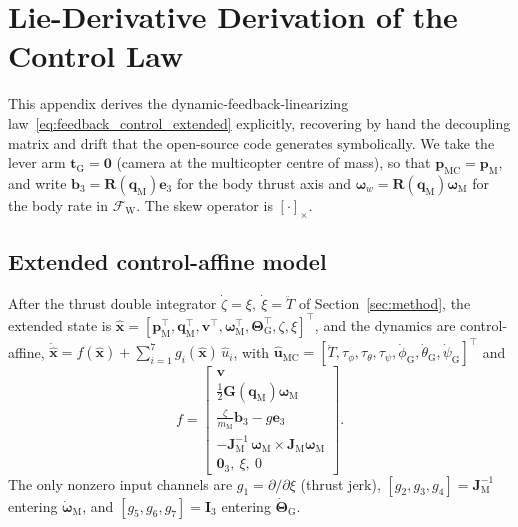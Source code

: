 \documentclass[letterpaper, 10 pt, conference]{ieeeconf}  %
\begin{document}



\appendix
\section{Lie-Derivative Derivation of the Control Law}
\label{app:dfl}

This appendix derives the dynamic-feedback-linearizing law~\eqref{eq:feedback_control_extended} explicitly, recovering by hand the decoupling matrix and drift that the open-source code generates symbolically. We take the lever arm $\mathbf{t}_\text{G}=\mathbf{0}$ (camera at the multicopter centre of mass), so that $\mathbf{p}_\text{MC}=\mathbf{p}_\text{M}$, and write $\mathbf{b}_3 = \mathbf{R}(\mathbf{q}_\text{M})\mathbf{e}_3$ for the body thrust axis and $\boldsymbol{\omega}_w = \mathbf{R}(\mathbf{q}_\text{M})\boldsymbol{\omega}_\text{M}$ for the body rate in $\mathcal{F}_\text{W}$. The skew operator is $[\cdot]_\times$.

\subsection{Extended control-affine model}
After the thrust double integrator $\dot{\zeta}=\xi,\ \dot{\xi}=\ddot{T}$ of Section~\ref{sec:method}, the extended state is $\hat{\mathbf{x}} = [\mathbf{p}_\text{M}^\top,\mathbf{q}_\text{M}^\top,\mathbf{v}^\top,\boldsymbol{\omega}_\text{M}^\top,\boldsymbol{\Theta}_\text{G}^\top,\zeta,\xi]^\top$, and the dynamics are control-affine, $\dot{\hat{\mathbf{x}}} = f(\hat{\mathbf{x}}) + \sum_{i=1}^{7} g_i(\hat{\mathbf{x}})\,\hat{u}_i$, with $\hat{\mathbf{u}}_\text{MC}=[\ddot{T},\tau_\phi,\tau_\theta,\tau_\psi,\dot{\phi}_\text{G},\dot{\theta}_\text{G},\dot{\psi}_\text{G}]^\top$ and
\begin{equation}
f=\begin{bmatrix}
\mathbf{v}\\
\tfrac12\mathbf{G}(\mathbf{q}_\text{M})\boldsymbol{\omega}_\text{M}\\
\tfrac{\zeta}{m_\text{M}}\mathbf{b}_3 - g\mathbf{e}_3\\
-\mathbf{J}_\text{M}^{-1}\,\boldsymbol{\omega}_\text{M}\times\mathbf{J}_\text{M}\boldsymbol{\omega}_\text{M}\\
\mathbf{0}_3,\ \xi,\ 0
\end{bmatrix}.
\end{equation}
The only nonzero input channels are $g_1=\partial/\partial\xi$ (thrust jerk), $[g_2,g_3,g_4]=\mathbf{J}_\text{M}^{-1}$ entering $\dot{\boldsymbol{\omega}}_\text{M}$, and $[g_5,g_6,g_7]=\mathbf{I}_3$ entering $\dot{\boldsymbol{\Theta}}_\text{G}$.
\end{document}
